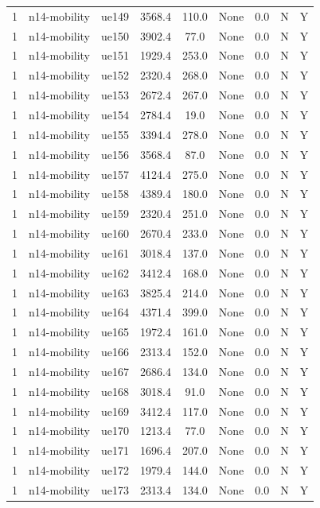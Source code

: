 \begin{table}[ht]
\begin{tabular}{|c|c|c|c|c|c|c|c|c|}
1 & n14-mobility & ue149 & 3568.4 & 110.0 & None & 0.0 & N & Y \\
1 & n14-mobility & ue150 & 3902.4 & 77.0 & None & 0.0 & N & Y \\
1 & n14-mobility & ue151 & 1929.4 & 253.0 & None & 0.0 & N & Y \\
1 & n14-mobility & ue152 & 2320.4 & 268.0 & None & 0.0 & N & Y \\
1 & n14-mobility & ue153 & 2672.4 & 267.0 & None & 0.0 & N & Y \\
1 & n14-mobility & ue154 & 2784.4 & 19.0 & None & 0.0 & N & Y \\
1 & n14-mobility & ue155 & 3394.4 & 278.0 & None & 0.0 & N & Y \\
1 & n14-mobility & ue156 & 3568.4 & 87.0 & None & 0.0 & N & Y \\
1 & n14-mobility & ue157 & 4124.4 & 275.0 & None & 0.0 & N & Y \\
1 & n14-mobility & ue158 & 4389.4 & 180.0 & None & 0.0 & N & Y \\
1 & n14-mobility & ue159 & 2320.4 & 251.0 & None & 0.0 & N & Y \\
1 & n14-mobility & ue160 & 2670.4 & 233.0 & None & 0.0 & N & Y \\
1 & n14-mobility & ue161 & 3018.4 & 137.0 & None & 0.0 & N & Y \\
1 & n14-mobility & ue162 & 3412.4 & 168.0 & None & 0.0 & N & Y \\
1 & n14-mobility & ue163 & 3825.4 & 214.0 & None & 0.0 & N & Y \\
1 & n14-mobility & ue164 & 4371.4 & 399.0 & None & 0.0 & N & Y \\
1 & n14-mobility & ue165 & 1972.4 & 161.0 & None & 0.0 & N & Y \\
1 & n14-mobility & ue166 & 2313.4 & 152.0 & None & 0.0 & N & Y \\
1 & n14-mobility & ue167 & 2686.4 & 134.0 & None & 0.0 & N & Y \\
1 & n14-mobility & ue168 & 3018.4 & 91.0 & None & 0.0 & N & Y \\
1 & n14-mobility & ue169 & 3412.4 & 117.0 & None & 0.0 & N & Y \\
1 & n14-mobility & ue170 & 1213.4 & 77.0 & None & 0.0 & N & Y \\
1 & n14-mobility & ue171 & 1696.4 & 207.0 & None & 0.0 & N & Y \\
1 & n14-mobility & ue172 & 1979.4 & 144.0 & None & 0.0 & N & Y \\
1 & n14-mobility & ue173 & 2313.4 & 134.0 & None & 0.0 & N & Y \\

\end{tabular}
\end{table}
